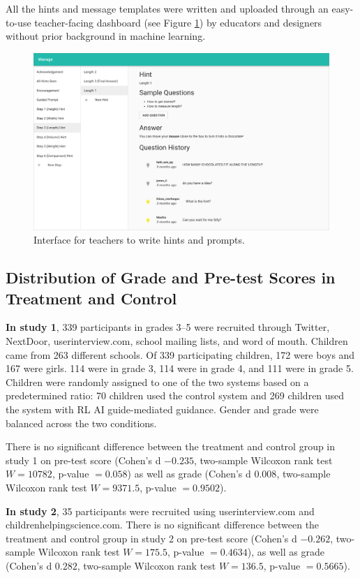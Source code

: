 \documentclass[sn-mathphys,Numbered]{sn-jnl}%
\theoremstyle{thmstyleone}%
\theoremstyle{thmstyletwo}%
\theoremstyle{thmstylethree}%
\begin{document}
\begin{appendices}
All the hints and message templates were written and uploaded through an easy-to-use teacher-facing dashboard (see Figure \ref{rlbot:fig:dashboard}) by educators and designers without prior background in machine learning. 

\begin{figure}[!th]%
    \centering
    \includegraphics[width=0.9\linewidth]{Figures/dashboard.png}
    \caption{Interface for teachers to write hints and prompts.}
    \label{rlbot:fig:dashboard}
\end{figure}

\subsection*{Distribution of Grade and Pre-test Scores in Treatment and Control}

\textbf{In study 1}, 339 participants in grades 3–5 were recruited through Twitter, NextDoor, userinterview.com, school mailing lists, and word of mouth. Children came from 263 different schools. Of 339 participating children, 172 were boys and 167 were girls. 114 were in grade 3, 114 were in grade 4, and 111 were in grade 5.  Children were randomly assigned to one of the two systems based on a predetermined ratio: 70 children used the control system and 269 children used the system with RL AI guide-mediated guidance. Gender and grade were balanced across the two conditions.

There is no significant difference between the treatment and control group in study 1 on pre-test score (Cohen's d $-0.235$, two-sample Wilcoxon rank test $W = 10782$, p-value $= 0.058$) as well as grade (Cohen's d $0.008$, two-sample Wilcoxon rank test $W = 9371.5$, p-value $= 0.9502$).

\textbf{In study 2}, 35 participants were recruited using userinterview.com and  childrenhelpingscience.com. There is no significant difference between the treatment and control group in study 2 on pre-test score (Cohen's d $-0.262$, two-sample Wilcoxon rank test $W = 175.5$, p-value $= 0.4634$), as well as grade (Cohen's d $0.282$, two-sample Wilcoxon rank test $W = 136.5$, p-value $= 0.5665$).


\end{appendices}
\end{document}
